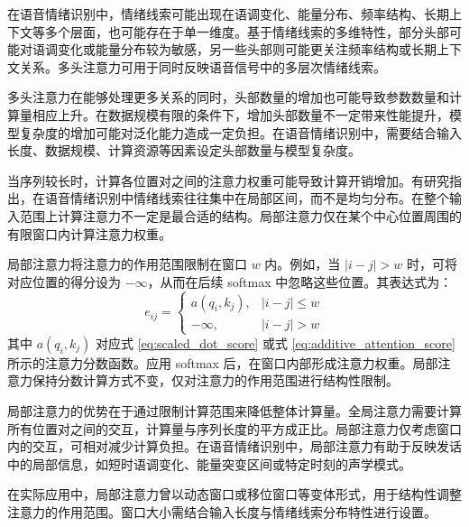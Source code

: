 在语音情绪识别中，情绪线索可能出现在语调变化、能量分布、频率结构、长期上下文等多个层面，也可能存在于单一维度。基于情绪线索的多维特性，部分头部可能对语调变化或能量分布较为敏感，另一些头部则可能更关注频率结构或长期上下文关系。多头注意力可用于同时反映语音信号中的多层次情绪线索\cite{he2023multiple,chen2023dwformer,wang2024swin,hou2022multi}。

多头注意力在能够处理更多关系的同时，头部数量的增加也可能导致参数数量和计算量相应上升。在数据规模有限的条件下，增加头部数量不一定带来性能提升，模型复杂度的增加可能对泛化能力造成一定负担\cite{chen2023dwformer,wang2024swin,lin2023chunk,gao2024adversarial,ahn2025multitask}。在语音情绪识别中，需要结合输入长度、数据规模、计算资源等因素设定头部数量与模型复杂度。

当序列较长时，计算各位置对之间的注意力权重可能导致计算开销增加。有研究指出，在语音情绪识别中情绪线索往往集中在局部区间，而不是均匀分布。在整个输入范围上计算注意力不一定是最合适的结构\cite{mirsamadi2017automatic,chen2023dwformer}。局部注意力仅在某个中心位置周围的有限窗口内计算注意力权重。

局部注意力将注意力的作用范围限制在窗口 $w$ 内。例如，当 $|i-j| > w$ 时，可将对应位置的得分设为 $-\infty$，从而在后续 softmax 中忽略这些位置。其表达式为：
\begin{equation}
e_{ij} =
\begin{cases}
a(q_i,k_j), & |i-j|\le w \\
-\infty, & |i-j| > w
\end{cases}
\label{eq:local_attention_window}
\end{equation}
其中 $a(q_i,k_j)$ 对应式 \eqref{eq:scaled_dot_score} 或式 \eqref{eq:additive_attention_score} 所示的注意力分数函数。应用 softmax 后，在窗口内部形成注意力权重。局部注意力保持分数计算方式不变，仅对注意力的作用范围进行结构性限制。

局部注意力的优势在于通过限制计算范围来降低整体计算量。全局注意力需要计算所有位置对之间的交互，计算量与序列长度的平方成正比。局部注意力仅考虑窗口内的交互，可相对减少计算负担\cite{chen2023dwformer}。在语音情绪识别中，局部注意力有助于反映发话中的局部信息，如短时语调变化、能量突变区间或特定时刻的声学模式\cite{mirsamadi2017automatic}。

在实际应用中，局部注意力曾以动态窗口或移位窗口等变体形式，用于结构性调整注意力的作用范围\cite{mirsamadi2017automatic,chen2023dwformer,wang2024swin}。窗口大小需结合输入长度与情绪线索分布特性进行设置。



